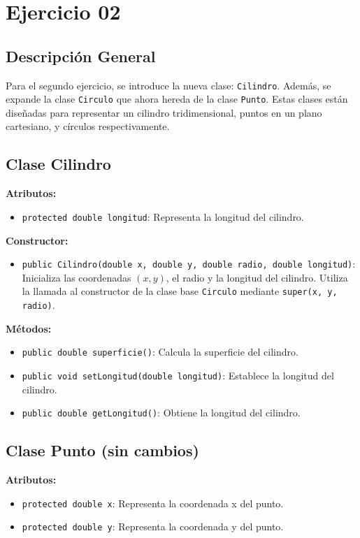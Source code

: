 \section{Ejercicio 02}

\subsection{Descripción General}
Para el segundo ejercicio, se introduce la nueva clase: \texttt{Cilindro}. Además, se expande la clase \texttt{Circulo} que ahora hereda de la clase \texttt{Punto}. Estas clases están diseñadas para representar un cilindro tridimensional, puntos en un plano cartesiano, y círculos respectivamente.

\subsection{Clase Cilindro}
\textbf{Atributos:}
\begin{itemize}
    \item \texttt{protected double longitud}: Representa la longitud del cilindro.
\end{itemize}

\textbf{Constructor:}
\begin{itemize}
    \item \texttt{public Cilindro(double x, double y, double radio, double longitud)}: Inicializa las coordenadas \((x, y)\), el radio y la longitud del cilindro. Utiliza la llamada al constructor de la clase base \texttt{Circulo} mediante \texttt{super(x, y, radio)}.
\end{itemize}

\textbf{Métodos:}
\begin{itemize}
    \item \texttt{public double superficie()}: Calcula la superficie del cilindro.
    \item \texttt{public void setLongitud(double longitud)}: Establece la longitud del cilindro.
    \item \texttt{public double getLongitud()}: Obtiene la longitud del cilindro.
\end{itemize}

\subsection{Clase Punto (sin cambios)}
\textbf{Atributos:}
\begin{itemize}
    \item \texttt{protected double x}: Representa la coordenada x del punto.
    \item \texttt{protected double y}: Representa la coordenada y del punto.
\end{itemize}

